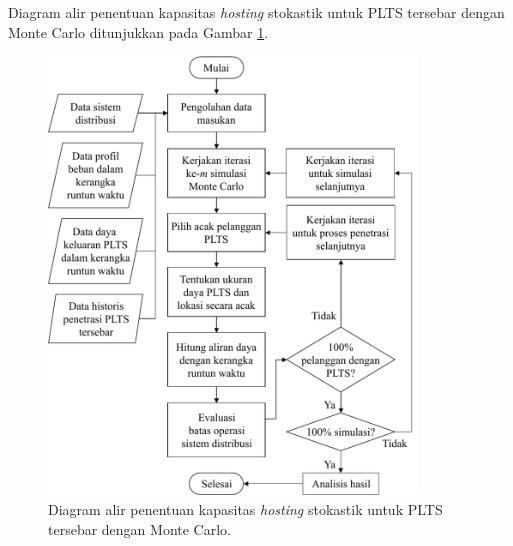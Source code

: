 {Diagram alir penentuan kapasitas \textit{\textit{hosting}} stokastik untuk PLTS tersebar dengan Monte Carlo ditunjukkan pada Gambar \ref{fcmc}.
\begin{figure}[!t]
	\centering
	\includegraphics[width=0.87\textwidth]{Fig/fcmc}
	\caption{Diagram alir penentuan kapasitas \textit{\textit{hosting}} stokastik untuk PLTS tersebar dengan Monte Carlo.}
	\label{fcmc}
\end{figure}
}
